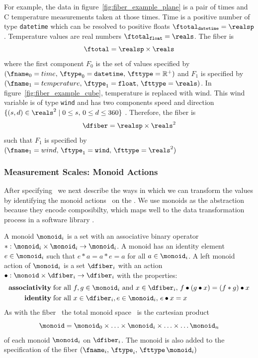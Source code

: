 \documentclass[../main.tex]{subfiles}
\begin{document}
For example, the data in figure~\ref{fig:fiber_example_plane} is a pair of times and \textdegree C temperature measurements taken at those times. Time is a positive number of type \texttt{datetime} which can be resolved to positive floats $\ftotal_{\texttt{datetime}}= \realsp$. Temperature values are real numbers $\ftotal_{\texttt{float}} = \reals$. The fiber is 
\begin{equation}
    \ftotal =  \realsp \times \reals 
\end{equation} 
where the first component $F_0$ is the set of values specified by $(\fname_0=time,\, \ftype_0=\texttt{datetime},\, \fttype=\mathbb{R}^+)$ and $F_1$ is specified by $(\fname_1=temperature,\, \ftype_1=\texttt{float},\, \fttype=\reals)$. In figure~\ref{fig:fiber_example_cube}, temperature is replaced with wind. This wind variable is of type \texttt{wind} and has two components speed and direction $\{(s,d) \in \reals^{2} \mid  0\leq s,\, 0 \leq d \leq 360\}$ . Therefore, the fiber is 
\begin{equation}
    \dfiber = \realsp \times \reals^{2}
\end{equation} 
such that $F_1$ is specified by $(\fname_1 = wind,\, \ftype_1=\texttt{wind},\, \fttype=\reals^{2})$  

\subsubsection{Measurement Scales: Monoid Actions}
\label{sec:data_monoid}
After specifying \dfiber\, we next describe the ways in which we can transform the values by identifying the monoid actions \monoid\ on the \dfiber. We use monoids as the abstraction because they encode composibilty, which maps well to the data transformation process in a software library \cite{yorgeyMonoidsThemeVariations}. 

A monoid \cite{Monoid2021} $\monoid_i$ is a set with an associative binary operator $\ast:\monoid_i \times \monoid_i\rightarrow \monoid_i$. A monoid has an identity element $e\in \monoid_i$ such that $e\ast a= a \ast e = a$ for all $a \in \monoid_i$. A left monoid action \cite{SemigroupAction2021,ActionNLab} of $\monoid_i$ is a set $\dfiber_i$ with an action $\bullet: \monoid\times \dfiber_i \rightarrow \dfiber_i$ with the properties:
\begin{align*}
    \textbf{associativity}\;& \text{for all } f,g \in \monoid_i \text{ and } x\in \dfiber_i,\, f\bullet(g\bullet x) = (f\ast g) \bullet x\\
    \textbf{identity}\;& \text{for all } x\in \dfiber_i, e\in \monoid_i,\,  e\bullet x = x 
\end{align*}
As with the fiber \dfiber\, the total monoid space \monoid\ is the cartesian product
\begin{equation}
\monoid= \monoid_{0} \times \ldots \times \monoid_{i}\times \ldots \times\ldots \monoid_{n}
\end{equation}
of each monoid $\monoid_{i}$ on $\dfiber_{i}$.  The monoid is also added to the specification of the fiber $(\fname_i,\, \ftype_i,\, \fttype\, \monoid_i)$
\end{document}
